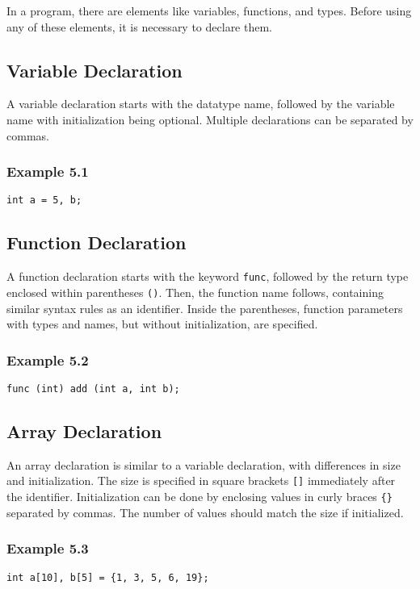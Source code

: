 \documentclass[12pt]{fphw}
\begin{document}
In a program, there are elements like variables, functions, and types. Before using any of these elements, it is necessary to declare them.

\subsection{Variable Declaration}

A variable declaration starts with the datatype name, followed by the variable name with initialization being optional. Multiple declarations can be separated by commas.

\subsubsection*{Example 5.1}
\begin{verbatim}
int a = 5, b;
\end{verbatim}

\subsection{Function Declaration}

A function declaration starts with the keyword \texttt{func}, followed by the return type enclosed within parentheses \texttt{()}. Then, the function name follows, containing similar syntax rules as an identifier. Inside the parentheses, function parameters with types and names, but without initialization, are specified.

\subsubsection*{Example 5.2}
\begin{verbatim}
func (int) add (int a, int b);
\end{verbatim}

\subsection{Array Declaration}

An array declaration is similar to a variable declaration, with differences in size and initialization. The size is specified in square brackets \texttt{[]} immediately after the identifier. Initialization can be done by enclosing values in curly braces \texttt{\{\}} separated by commas. The number of values should match the size if initialized.

\subsubsection*{Example 5.3}
\begin{verbatim}
int a[10], b[5] = {1, 3, 5, 6, 19};
\end{verbatim}
\end{document}
